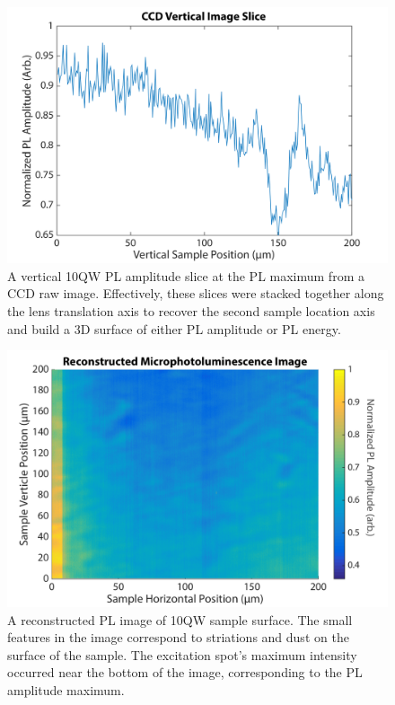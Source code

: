 \begin{figure}[h!]
\centering
\includegraphics[width = .8\textwidth]{RawCCDIMGvertslce.png}
\caption{ \doublespacing A vertical 10QW PL amplitude slice at the PL maximum from a CCD raw image. Effectively, these slices were stacked together along the lens translation axis to recover the second sample location axis and build a 3D surface of either PL amplitude or PL energy.}
\label{slice}
\end{figure}
\begin{figure}[h!]
\centering
\includegraphics[width = .8\textwidth]{PLIMG_10QW.png}
\caption{ \doublespacing A reconstructed PL image of 10QW sample surface. The small features in the image correspond to striations and dust on the surface of the sample. The excitation spot's maximum intensity occurred near the bottom of the image, corresponding to the PL amplitude maximum.}
\label{total10qw}
\end{figure}
